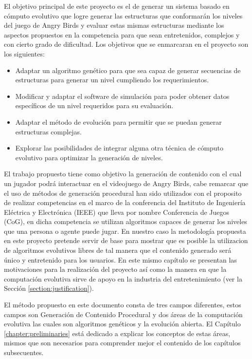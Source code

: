 El objetivo principal de este proyecto es el de generar un sistema basado en
cómputo evolutivo que logre generar las estructuras que conformarán los niveles
del juego de Angry Birds y evaluar estas mismas estructuras mediante los
aspectos propuestos en la competencia para que sean entretenidos, complejos y con 
cierto grado de dificultad.  Los objetivos que se enmarcaran en el proyecto son los siguientes: 

\begin{itemize}
  \item Adaptar un algoritmo genético para que sea capaz de generar secuencias
  de estructuras para generar un nivel cumpliendo los requerimientos.
  \item Modificar y adaptar el software de simulación para poder obtener datos
  específicos de un nivel requeridos para su evaluación.
  \item Adaptar el método de evolución para permitir que se puedan generar
  estructuras complejas.
  \item Explorar las posibilidades de integrar alguna otra técnica de cómputo
  evolutivo para optimizar la generación de niveles.
\end{itemize} 

El trabajo propuesto tiene como objetivo la generación
de contenido con el cual un jugador podrá interactuar en el videojuego de
Angry Birds, cabe remarcar que el uso de métodos de generación procedural han
sido utilizados con el proposito de realizar competencias en el marco de la
conferencia del Instituto de Ingeniería Eléctrica y Electrónica (IEEE) que lleva
por nombre Conferencia de Juegos (CoG), en dicha competencia se utilizan
algoritmos capaces de generar los niveles que una persona o agente puede jugar.
En nuestro caso la metodología propuesta en este proyecto pretende servir de
base para mostrar que es posible la utilizacion de algoritmos evolutivos libres
de tal manera que el contenido generado será único y entretenido para los
usuarios. En este mismo capítulo se presentan las motivaciones para la
realización del proyecto así como la manera en que la computación evolutiva
sirve de apoyo en la industria del entretenimiento (ver la Sección
\ref{section:justification}).

El método propuesto en este documento consta de tres campos diferentes, estos
campos son Generación de Contenido Procedural y dos áreas de la computación
evolutiva las cuales son algoritmos genéticos y la evolución abierta. El
Capítulo \ref{chapter:preliminaries} está dedicado a explicar los conceptos
de estas áreas, mismos que son necesarios para comprender mejor el contenido de
los capítulos subsecuentes.

